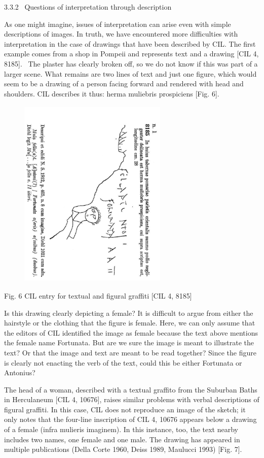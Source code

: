 \documentclass[amsthm,ebook]{saparticle}
\begin{document}
\bigskip

3.3.2 \ Questions of interpretation through description\ \ 

As one might imagine, issues of interpretation can arise even with simple descriptions of images. In truth, we have
encountered more difficulties with interpretation in the case of drawings that have been described by CIL. The first
example comes from a shop in Pompeii and represents text and a drawing [CIL 4, 8185]. \ The plaster has clearly broken
off, so we do not know if this was part of a larger scene. What remains are two lines of text and just one figure,
which would seem to be a drawing of a person facing forward and rendered with head and shoulders. CIL describes it
thus: herma muliebris prospiciens [Fig. 6].

\begin{figure}
\centering
\includegraphics[width=7.1cm,height=9.155cm]{EAGLE2016BenefielSypniewski-img006.jpg}
\end{figure}
Fig. 6 CIL entry for textual and figural graffiti [CIL 4, 8185]


\bigskip

Is this drawing clearly depicting a female? It is difficult to argue from either the hairstyle or the clothing that the
figure is female. Here, we can only assume that the editors of CIL identified the image as female because the text
above mentions the female name Fortunata. But are we sure the image is meant to illustrate the text? Or that the image
and text are meant to be read together? Since the figure is clearly not enacting the verb of the text, could this be
either Fortunata or Antonius?

The head of a woman, described with a textual graffito from the Suburban Baths in Herculaneum [CIL 4, 10676], raises
similar problems with verbal descriptions of figural graffiti. In this case, CIL does not reproduce an image of the
sketch; it only notes that the four-line inscription of CIL 4, 10676 appears below a drawing of a female (infra
mulieris imaginem). In this instance, too, the text nearby includes two names, one female and one male. The drawing has
appeared in multiple publications (Della Corte 1960, Deiss 1989, Maulucci 1993) [Fig. 7]. 
\end{document}
